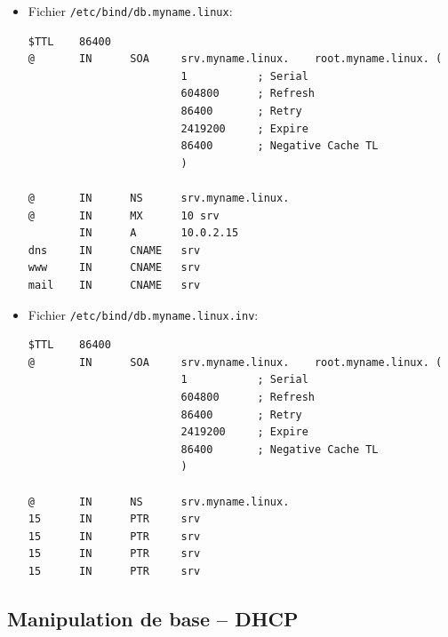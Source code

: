 \documentclass[a4paper]{article}
\begin{document}
\begin{itemize}

\item Fichier \texttt{/etc/bind/db.myname.linux}:
\begin{example} \begin{verbatim}
$TTL    86400
@       IN      SOA     srv.myname.linux.    root.myname.linux. (
                        1           ; Serial
                        604800      ; Refresh
                        86400       ; Retry
                        2419200     ; Expire
                        86400       ; Negative Cache TL
                        )

@       IN      NS      srv.myname.linux.
@       IN      MX      10 srv
        IN      A       10.0.2.15
dns     IN      CNAME   srv
www     IN      CNAME   srv
mail    IN      CNAME   srv
\end{verbatim} \end{example}

\item Fichier \texttt{/etc/bind/db.myname.linux.inv}:
\begin{example} \begin{verbatim}
$TTL    86400
@       IN      SOA     srv.myname.linux.    root.myname.linux. (
                        1           ; Serial
                        604800      ; Refresh
                        86400       ; Retry
                        2419200     ; Expire
                        86400       ; Negative Cache TL
                        )

@       IN      NS      srv.myname.linux.
15      IN      PTR     srv
15      IN      PTR     srv
15      IN      PTR     srv
15      IN      PTR     srv
\end{verbatim} \end{example}

\end{itemize}










\subsection{Manipulation de base -- DHCP}
\end{document}
